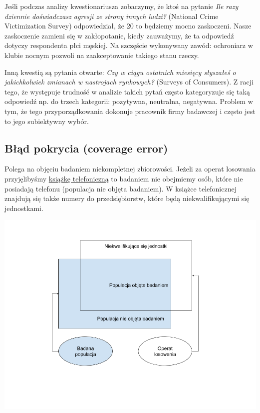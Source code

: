 \documentclass[
]{book}
\begin{document}
Jeśli podczas analizy kwestionariusza zobaczymy, że ktoś na pytanie \emph{Ile razy dziennie doświadczasz agresji ze strony innych ludzi?} (National Crime Victimization Survey) odpowiedział, że 20 to będziemy mocno zaskoczeni. Nasze zaskoczenie zamieni się w zakłopotanie, kiedy zauważymy, że ta odpowiedź dotyczy respondenta płci męskiej. Na szczęście wykonywany zawód: ochroniarz w klubie nocnym pozwoli na zaakceptowanie takiego stanu rzeczy.

Inną kwestią są pytania otwarte: \emph{Czy w ciągu ostatnich miesięcy słyszałeś o jakichkolwiek zmianach w nastrojach rynkowych?} (Surveys of Consumers). Z racji tego, że występuje trudność w analizie takich pytań często kategoryzuje się taką odpowiedź np. do trzech kategorii: pozytywna, neutralna, negatywna. Problem w tym, że tego przyporządkowania dokonuje pracownik firmy badawczej i często jest to jego subiektywny wybór.

\hypertarget{bux142ux105d-pokrycia-coverage-error}{%
\subsection{Błąd pokrycia (coverage error)}\label{bux142ux105d-pokrycia-coverage-error}}

Polega na objęciu badaniem niekompletnej zbiorowości. Jeżeli za operat losowania przyjęlibyśmy \href{https://pl.wikipedia.org/wiki/Plik:Pierwsza_Polska_Ksi\%C4\%85\%C5\%BCka_Telefoniczna.jpg}{książkę telefoniczną} to badaniem nie obejmiemy osób, które nie posiadają telefonu (populacja nie objęta badaniem). W książce telefonicznej znajdują się także numery do przedsiębiorstw, które będą niekwalifikującymi się jednostkami.

\includegraphics{img/operat.png}
\end{document}

